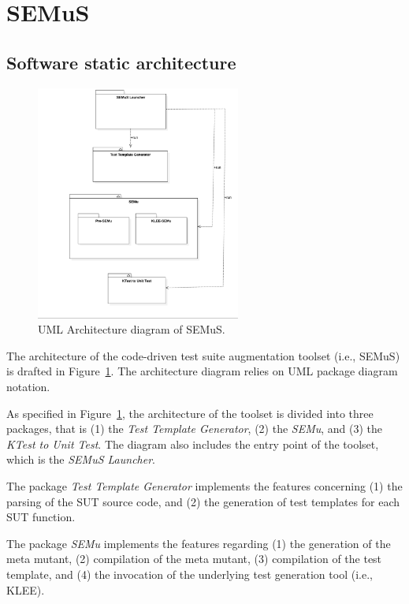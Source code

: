
\section{SEMuS}

\subsection{Software static architecture}

\begin{figure}[tb]
  \centering
  \includegraphics[width=0.6\textwidth]{images/semus-arch-sdd}
      \caption{UML Architecture diagram of SEMuS.}
      \label{fig:architecture_diagram_semus}
\end{figure}

The architecture of the code-driven test suite augmentation toolset (i.e., SEMuS) is drafted in Figure~\ref{fig:architecture_diagram_semus}. The architecture diagram relies on UML package diagram notation.

As specified in Figure~\ref{fig:architecture_diagram_semus}, the architecture of the toolset is divided into three packages, that is (1) the \emph{Test Template Generator}, (2) the \emph{SEMu}, and (3) the \emph{KTest to Unit Test}. The diagram also includes the entry point of the toolset, which is the \emph{SEMuS Launcher}.

The package \emph{Test Template Generator} implements the features concerning (1) the parsing of the SUT source code, and (2) the generation of test templates for each SUT function.

The package \emph{SEMu} implements the features regarding (1) the generation of the meta mutant, (2) compilation of the meta mutant, (3) compilation of the test template, and (4) the invocation of the underlying test generation tool (i.e., KLEE).


